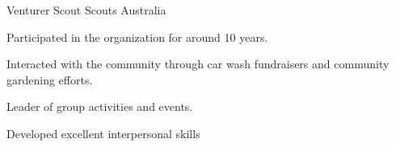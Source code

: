 

\begin{cventries}

  \cventry
    {Venturer Scout} %
    {Scouts Australia} %
    {} %
    {} %
    {
      \begin{cvitems} %
        \item {Participated in the organization for around 10 years.}
        \item {Interacted with the community through car wash fundraisers and community gardening efforts.}
        \item {Leader of group activities and events.}
        \item {Developed excellent interpersonal skills}
      \end{cvitems}
    }

\end{cventries}